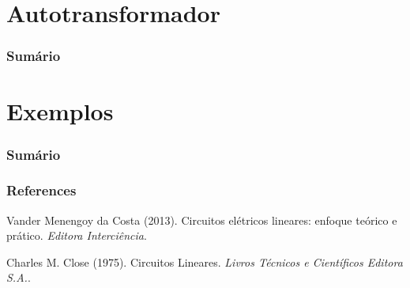 \documentclass[mathserif,usenames,dvipsnames]{beamer}
\begin{document}
\section{Autotransformador}
\begin{frame}
\frametitle{Sumário}
\small
\tableofcontents[currentsection]
\end{frame}



\section{Exemplos}
\begin{frame}
\frametitle{Sumário}
\small
\tableofcontents[currentsection]
\end{frame}

\begin{frame}
\frametitle{References}
\footnotesize{
	\begin{thebibliography}{99} %
		 Vander Menengoy da Costa (2013).
		\newblock Circuitos elétricos lineares: enfoque teórico e prático.
		\newblock \emph{Editora Interciência}.
		
		 Charles M. Close (1975).
		\newblock Circuitos Lineares.
		\newblock \emph{Livros Técnicos e Científicos Editora S.A.}.
	\end{thebibliography}
}
\end{frame}
\end{document}
